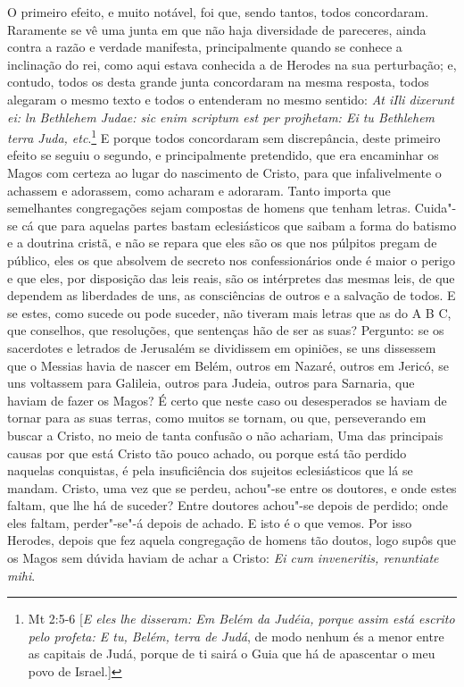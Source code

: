 O primeiro efeito, e muito notável, foi que, sendo tantos, todos
concordaram. Raramente se vê uma junta em que não haja diversidade de
pareceres, ainda contra a
razão e verdade manifesta, principalmente quando se conhece a inclinação
do rei, como aqui estava conhecida a de Herodes na sua perturbação; e,
contudo, todos os desta grande junta concordaram na mesma resposta,
todos alegaram o mesmo texto e todos o entenderam no mesmo sentido:
\emph{At iIli dixerunt ei: ln Bethlehem Judae: sic enim scriptum est per
projhetam: Ei tu Bethlehem terra Juda, etc}.\footnote{Mt 2:5-6 [\emph{E eles lhe disseram: Em Belém da Judéia, porque assim está escrito pelo profeta: E tu,
Belém, terra de Judá}, de modo nenhum és a menor entre as capitais de Judá, porque de ti sairá o Guia que há de apascentar o meu povo de Israel.]} E porque todos
concordaram sem discrepância, deste primeiro efeito se seguiu o segundo,
e principalmente pretendido, que era encaminhar os Magos com certeza ao
lugar do nascimento de Cristo, para que infalivelmente o achassem e
adorassem, como acharam e adoraram. Tanto importa que semelhantes
congregações sejam compostas de homens que tenham letras. Cuida"-se cá
que para aquelas partes bastam eclesiásticos que saibam a forma do
batismo e a doutrina cristã, e não se repara que eles são os que nos
púlpitos pregam de público, eles os que absolvem de secreto nos
confessionários onde é maior o perigo e que eles, por disposição das
leis reais, são os intérpretes das mesmas leis, de que dependem as
liberdades de uns, as consciências de outros e a salvação de todos. E se
estes, como sucede ou pode suceder, não tiveram mais letras que as do A
B C, que conselhos, que resoluções, que sentenças hão de ser as suas?
Pergunto: se os sacerdotes e letrados de Jerusalém se dividissem em
opiniões, se uns dissessem que o Messias havia de nascer em Belém,
outros em Nazaré, outros em Jericó, se uns voltassem para Galileia,
outros para Judeia, outros para Sarnaria, que haviam de fazer os Magos?
É certo que neste caso ou desesperados se haviam de tornar para as suas
terras, como muitos se tornam, ou que, perseverando em buscar a Cristo,
no meio de tanta confusão o não achariam, Uma das principais causas por
que está Cristo tão pouco achado, ou porque está tão perdido naquelas
conquistas, é pela insuficiência dos sujeitos eclesiásticos que lá se
mandam. Cristo, uma vez que se perdeu, achou"-se entre os doutores, e
onde estes faltam, que lhe há de suceder? Entre doutores achou"-se depois
de perdido; onde eles faltam, perder"-se"-á depois de achado. E isto é o
que vemos. Por isso Herodes, depois que fez aquela congregação de homens
tão doutos, logo supôs que os Magos sem dúvida haviam de achar a Cristo:
\emph{Ei cum inveneritis, renuntiate mihi}.

